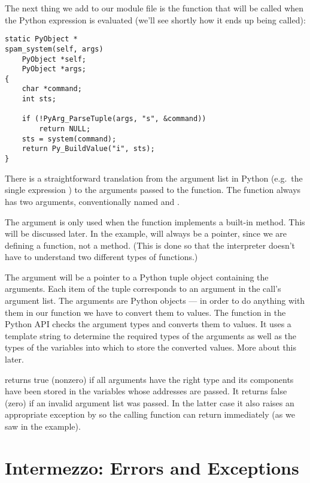 \documentclass{manual}
\begin{document}
The next thing we add to our module file is the \C{} function that will
be called when the Python expression 
is evaluated (we'll see shortly how it ends up being called):

\begin{verbatim}
static PyObject *
spam_system(self, args)
    PyObject *self;
    PyObject *args;
{
    char *command;
    int sts;

    if (!PyArg_ParseTuple(args, "s", &command))
        return NULL;
    sts = system(command);
    return Py_BuildValue("i", sts);
}
\end{verbatim}

There is a straightforward translation from the argument list in
Python (e.g.\ the single expression ) to the arguments
passed to the \C{} function.  The \C{} function always has two arguments,
conventionally named  and .

The  argument is only used when the \C{} function implements a
built-in method.  This will be discussed later. In the example,
 will always be a \NULL{} pointer, since we are defining
a function, not a method.  (This is done so that the interpreter
doesn't have to understand two different types of \C{} functions.)

The  argument will be a pointer to a Python tuple object
containing the arguments.  Each item of the tuple corresponds to an
argument in the call's argument list.  The arguments are Python
objects --- in order to do anything with them in our \C{} function we have
to convert them to \C{} values.  The function 
in the Python API checks the argument types and converts them to \C{}
values.  It uses a template string to determine the required types of
the arguments as well as the types of the \C{} variables into which to
store the converted values.  More about this later.

 returns true (nonzero) if all arguments have
the right type and its components have been stored in the variables
whose addresses are passed.  It returns false (zero) if an invalid
argument list was passed.  In the latter case it also raises an
appropriate exception by so the calling function can return
\NULL{} immediately (as we saw in the example).


\section{Intermezzo: Errors and Exceptions}
\label{errors}
\end{document}
